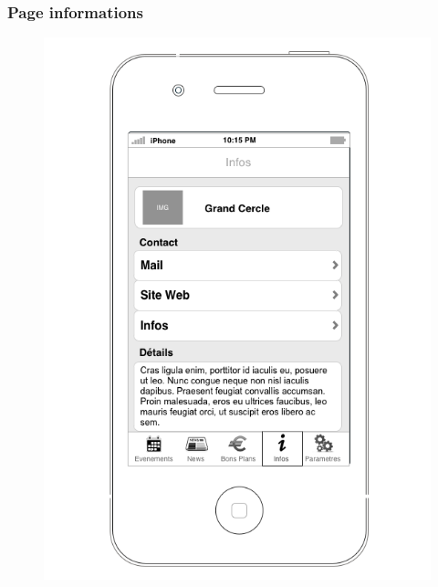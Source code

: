 \documentclass[a4paper, 11px]{article}
\begin{document}
\subsubsection{Page informations}
\vfill
\begin{figure}[htbp]
	\begin{minipage}[c]{.50\linewidth}
		\begin{center}
			\includegraphics[scale=0.3]{../../Sketch/iOS/infos.png}
		\end{center}
	\end{minipage}
\end{figure}
\end{document}
